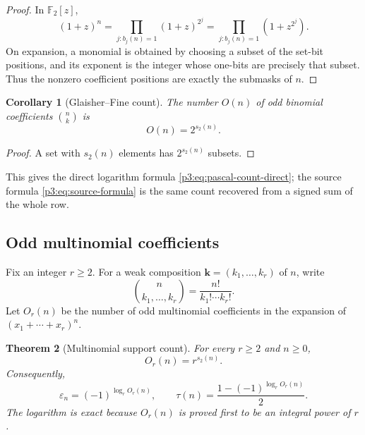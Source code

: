 \documentclass[11pt,oneside]{article}
\newtheorem{theorem}{Theorem}[section]
\newtheorem{corollary}[theorem]{Corollary}
\theoremstyle{definition}
\theoremstyle{remark}
\newcommand{\F}{\mathbb F}
\newcommand{\swt}{s_2}
\newcommand{\eps}{\varepsilon}
\newcommand{\1}{\mathbf 1}
\begin{document}
\begin{proof}
In \(\F_2[z]\),
\[
 (1+z)^n
 =\prod_{j:b_j(n)=1}(1+z)^{2^j}
 =\prod_{j:b_j(n)=1}(1+z^{2^j}).
\]
On expansion, a monomial is obtained by choosing a subset of the set-bit positions, and its
exponent is the integer whose one-bits are precisely that subset.  Thus the nonzero
coefficient positions are exactly the submasks of \(n\).
\end{proof}

\begin{corollary}[Glaisher--Fine count]
\label{p3:cor:glaisher-count}
The number \(O(n)\) of odd binomial coefficients \(\binom nk\) is
\begin{equation}
 O(n)=2^{\swt(n)}.
 \label{p3:eq:glaisher-count}
\end{equation}
\end{corollary}

\begin{proof}
A set with \(\swt(n)\) elements has \(2^{\swt(n)}\) subsets.
\end{proof}

This gives the direct logarithm formula \eqref{p3:eq:pascal-count-direct}; the source formula
\eqref{p3:eq:source-formula} is the same count recovered from a signed sum of the whole row.

\subsection{Odd multinomial coefficients}

Fix an integer \(r\ge2\).  For a weak composition
\(\bm k=(k_1,\ldots,k_r)\) of \(n\), write
\[
 \binom{n}{k_1,\ldots,k_r}=\frac{n!}{k_1!\cdots k_r!}.
\]
Let \(O_r(n)\) be the number of odd multinomial coefficients in the expansion of
\((x_1+\cdots+x_r)^n\).

\begin{theorem}[Multinomial support count]
\label{p3:thm:multinomial-count}
For every \(r\ge2\) and \(n\ge0\),
\begin{equation}
 \boxed{O_r(n)=r^{\swt(n)}.}
 \label{p3:eq:multinomial-count}
\end{equation}
Consequently,
\begin{equation}
 \boxed{
 \eps_n=(-1)^{\log_r O_r(n)},
 \qquad
 \tau(n)=\frac{1-(-1)^{\log_rO_r(n)}}2.}
 \label{p3:eq:multinomial-log-direct}
\end{equation}
The logarithm is exact because \(O_r(n)\) is proved first to be an integral power of \(r\).
\end{theorem}
\end{document}
